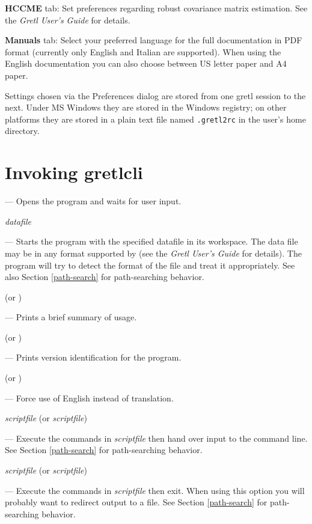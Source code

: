 \textbf{HCCME} tab: Set preferences regarding robust covariance matrix
estimation.  See the \emph{Gretl User's Guide} for details.
      
\textbf{Manuals} tab: Select your preferred language for the full
 documentation in PDF format (currently only English and
Italian are supported).  When using the English documentation you can
also choose between US letter paper and A4 paper.
      
Settings chosen via the Preferences dialog are stored from one gretl
session to the next.  Under MS Windows they are stored in the Windows
registry; on other platforms they are stored in a plain text file
named \texttt{.gretl2rc} in the user's home directory.
      
\section{Invoking gretlcli}
\label{optarg2}


--- Opens the program and waits for user input.
      
 \textsl{datafile}

--- Starts the program with the specified datafile in its
workspace. The data file may be in any format supported by 
(see the \emph{Gretl User's Guide} for details). The program will try
to detect the format of the file and treat it appropriately. See also
Section \ref{path-search} for path-searching behavior.

 (or )

--- Prints a brief summary of usage.

 (or )

--- Prints version identification for the program.

 (or )

--- Force use of English instead of translation.

 \textsl{scriptfile} (or 
\textsl{scriptfile})

--- Execute the commands in \textsl{scriptfile} then hand over input
to the command line.  See Section \ref{path-search} for path-searching
behavior.

 \textsl{scriptfile} (or 
\textsl{scriptfile})

--- Execute the commands in \textsl{scriptfile} then exit.  When using
this option you will probably want to redirect output to a file. See
Section \ref{path-search} for path-searching behavior.

